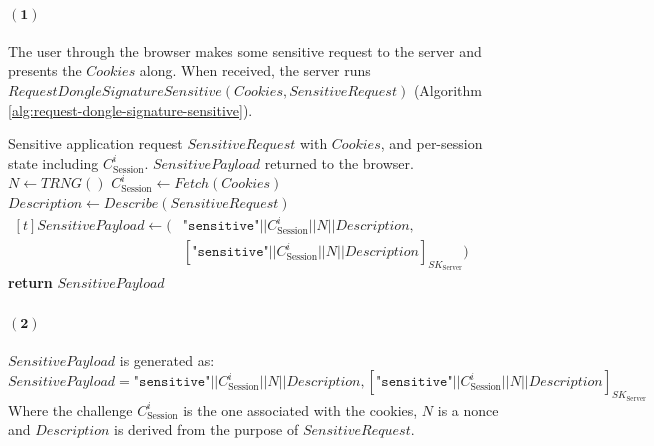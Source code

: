 \paragraph{$\boldsymbol{(1)}$} The user through the browser makes some sensitive request to the server and presents the $Cookies$ along. When received, the server runs $RequestDongleSignatureSensitive(Cookies, SensitiveRequest)$ (Algorithm \ref{alg:request-dongle-signature-sensitive}).
\begin{algorithm}[ht!]
\caption{$RequestDongleSignatureSensitive(Cookies, SensitiveRequest)$}
\begin{algorithmic}[1]
    \Require Sensitive application request $SensitiveRequest$ with $Cookies$, and per-session state including $C^i_{\text{Session}}$.
    \Ensure  $SensitivePayload$ returned to the browser.
    \State $N \leftarrow TRNG()$
    \State $C^i_{\text{Session}} \leftarrow Fetch(Cookies)$
    \State $Description \leftarrow Describe(SensitiveRequest)$
    \State $\begin{aligned}[t]
        SensitivePayload \leftarrow (
        &\texttt{"sensitive"} || C^i_{\text{Session}} || N || Description,\\
        &[\texttt{"sensitive"} || C^i_{\text{Session}} || N || Description]_{SK_{\text{Server}}})
        \end{aligned}$
    \State \textbf{return} $SensitivePayload$
\end{algorithmic}
\label{alg:request-dongle-signature-sensitive}
\end{algorithm}
\paragraph{$\boldsymbol{(2)}$} $SensitivePayload$ is generated as: 
$$SensitivePayload= \texttt{"sensitive"} || C^i_{\text{Session}} || N || Description,
        [\texttt{"sensitive"} || C^i_{\text{Session}} || N || Description]_{SK_{\text{Server}}}$$
Where the challenge $C_\text{Session}^i$ is the one associated with the cookies, $N$ is a nonce and $Description$ is derived from the purpose of $SensitiveRequest$.
